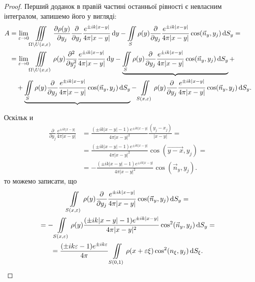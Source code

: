 \begin{proof}
	Перший доданок в правій частині останньої рівності є невласним інтегралом, запишемо його у вигляді:
	\begin{equation}
		\begin{aligned}
			A &= \displaystyle\lim\limits_{\varepsilon \to 0} \displaystyle\iiint\limits_{\Omega \setminus U(x, \varepsilon)} \frac{\partial \rho(y)}{\partial y_j} \frac{\partial}{\partial y_j} \frac{e^{\pm i k |x - y|}}{4 \pi |x - y|} \mathop{}\!\mathrm{d} y - \displaystyle\iint\limits_S \rho(y) \frac{\partial}{\partial y_j} \frac{e^{\pm i k |x - y|}}{4 \pi |x - y|} \cos(\vec n_y, y_j) \mathop{}\!\mathrm{d} S_y = \\
			&= \displaystyle\lim\limits_{\varepsilon \to 0} \displaystyle\iiint\limits_{\Omega \setminus U(x, \varepsilon)} \rho(y) \frac{\partial^2}{\partial y_j^2} \frac{e^{\pm i k |x - y|}}{4 \pi |x - y|} \mathop{}\!\mathrm{d} y - \underbrace{\displaystyle\iint\limits_S \rho(y) \frac{\partial}{\partial y_j} \frac{e^{\pm i k |x - y|}}{4 \pi |x - y|} \cos(\vec n_y, y_j) \mathop{}\!\mathrm{d} S_y} + \\
			& \quad + \underbrace{\displaystyle\iint\limits_S \rho(y) \frac{\partial}{\partial y_j} \frac{e^{\pm i k |x - y|}}{4 \pi |x - y|} \cos(\vec n_y, y_j) \mathop{}\!\mathrm{d} S_y} - \displaystyle\iint\limits_{S(x, \varepsilon)} \rho(y) \frac{\partial}{\partial y_j} \frac{e^{\pm i k |x - y|}}{4 \pi |x - y|} \cos(\vec n_y, y_j) \mathop{}\!\mathrm{d} S_y.
		\end{aligned}
	\end{equation} 

	Оскільк
и	\begin{equation}
		\begin{aligned}
			\frac{\partial}{\partial y_j} \frac{e^{\pm i k |x - y|}}{4 \pi |x - y|} &= \frac{(\pm i k |x - y| - 1) e^{\pm i k |x - y|}}{4 \pi |x - y|^2} \frac{(y_j - x_j)}{|x - y|} = \\
			&= \frac{(\pm i k |x - y| - 1) e^{\pm i k |x - y|}}{4 \pi |x - y|^2} \cos(\vec{y - x}, y_j) = \\
			&= -\frac{(\pm i k |x - y| - 1) e^{\pm i k |x - y|}}{4 \pi |x - y|^2} \cos(\vec n_y, y_j).
		\end{aligned}
	\end{equation}
	то можемо записати, що  
	\begin{multline}
		\displaystyle\iint\limits_{S(x, \varepsilon)} \rho(y) \frac{\partial}{\partial y_j} \frac{e^{\pm i k |x - y|}}{4 \pi |x - y|} \cos(\vec n_y, y_j) \mathop{}\!\mathrm{d} S_y = \\ 
		= - \displaystyle\iint\limits_{S(x, \varepsilon)} \rho(y) \frac{(\pm i k |x - y| - 1) e^{\pm i k |x - y|}}{4 \pi |x - y|^2} \cos^2(\vec n_y, y_j) \mathop{}\!\mathrm{d} S_y = \\
		= \frac{(\pm i k \varepsilon - 1) e^{\pm i k \varepsilon}}{4 \pi} \displaystyle\iint\limits_{S(0, 1)} \rho(x + \varepsilon \xi) \cos^2(n_\xi, y_j) \mathop{}\!\mathrm{d} S_\xi.
	\end{multline}


\end{proof}
